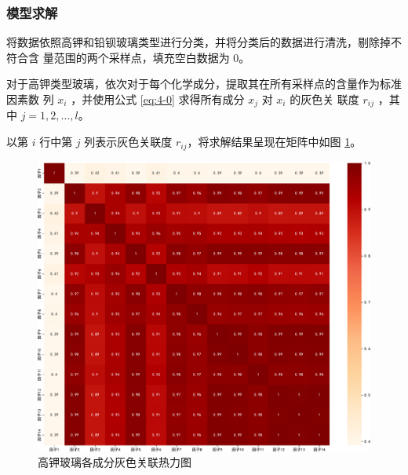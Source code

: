 \documentclass[withoutpreface,bwprint]{cumcmthesis} %
\begin{document}
\subsubsection{模型求解}
将数据依照高钾和铅钡玻璃类型进行分类，并将分类后的数据进行清洗，剔除掉不符合含
量范围的两个采样点，填充空白数据为 0。

对于高钾类型玻璃，依次对于每个化学成分，提取其在所有采样点的含量作为标准因素数
列 $x_i$ ，并使用公式 \eqref{eq:4-0} 求得所有成分 $x_j$ 对 $x_i$ 的灰色关
联度 $r_{ij}$ ，其中 $j=1,2,\dots,l$。

以第 $i$ 行中第 $j$ 列表示灰色关联度 $r_{ij}$，将求解结果呈现在矩阵中如图
\ref{fig:HighKgrey}。
\begin{figure}[!htb]
    \centering
    \includegraphics[scale=0.25]{高钾玻璃各成分灰色关联热力图.pdf}
    \caption{高钾玻璃各成分灰色关联热力图}
    \label{fig:HighKgrey}
\end{figure}
\end{document}
